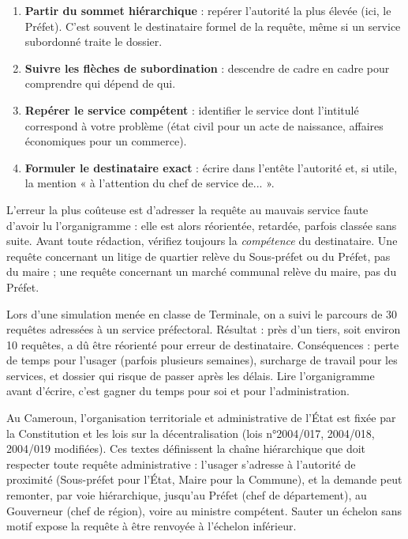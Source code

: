 \documentclass[11pt]{article}
\begin{document}
\begin{methode}
\begin{enumerate}
\item \textbf{Partir du sommet hiérarchique} : repérer l'autorité la plus élevée (ici, le Préfet). C'est souvent le destinataire formel de la requête, même si un service subordonné traite le dossier.
\item \textbf{Suivre les flèches de subordination} : descendre de cadre en cadre pour comprendre qui dépend de qui.
\item \textbf{Repérer le service compétent} : identifier le service dont l'intitulé correspond à votre problème (état civil pour un acte de naissance, affaires économiques pour un commerce).
\item \textbf{Formuler le destinataire exact} : écrire dans l'entête l'autorité et, si utile, la mention « à l'attention du chef de service de... ».
\end{enumerate}
\end{methode}

\begin{attention}
L'erreur la plus coûteuse est d'adresser la requête au mauvais service faute d'avoir lu l'organigramme : elle est alors réorientée, retardée, parfois classée sans suite. Avant toute rédaction, vérifiez toujours la \emph{compétence} du destinataire. Une requête concernant un litige de quartier relève du Sous-préfet ou du Préfet, pas du maire ; une requête concernant un marché communal relève du maire, pas du Préfet.
\end{attention}

\begin{exemplebox}
Lors d'une simulation menée en classe de Terminale, on a suivi le parcours de 30 requêtes adressées à un service préfectoral. Résultat : près d'un tiers, soit environ 10 requêtes, a dû être réorienté pour erreur de destinataire. Conséquences : perte de temps pour l'usager (parfois plusieurs semaines), surcharge de travail pour les services, et dossier qui risque de passer après les délais. Lire l'organigramme avant d'écrire, c'est gagner du temps pour soi et pour l'administration.
\end{exemplebox}

\begin{savaistu}
Au Cameroun, l'organisation territoriale et administrative de l'État est fixée par la Constitution et les lois sur la décentralisation (lois n°2004/017, 2004/018, 2004/019 modifiées). Ces textes définissent la chaîne hiérarchique que doit respecter toute requête administrative : l'usager s'adresse à l'autorité de proximité (Sous-préfet pour l'État, Maire pour la Commune), et la demande peut remonter, par voie hiérarchique, jusqu'au Préfet (chef de département), au Gouverneur (chef de région), voire au ministre compétent. Sauter un échelon sans motif expose la requête à être renvoyée à l'échelon inférieur.
\end{savaistu}
\end{document}
